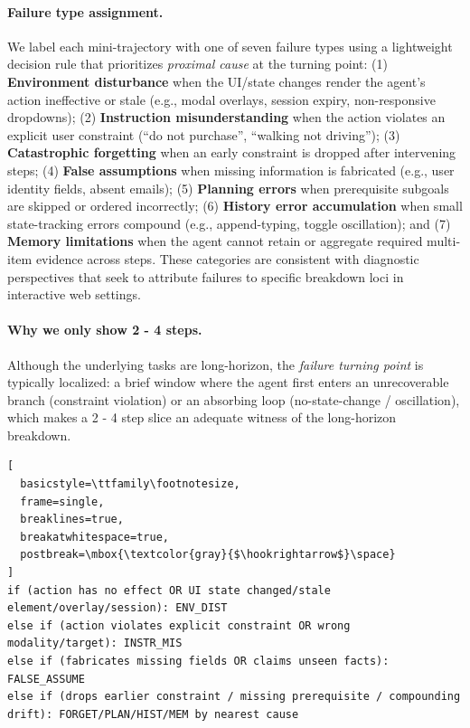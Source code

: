 \documentclass[11pt]{article}
\begin{document}
\paragraph{Failure type assignment.}
We label each mini-trajectory with one of seven failure types using a lightweight decision rule that prioritizes \emph{proximal cause} at the turning point: (1) \textbf{Environment disturbance} when the UI/state changes render the agent's action ineffective or stale (e.g., modal overlays, session expiry, non-responsive dropdowns); (2) \textbf{Instruction misunderstanding} when the action violates an explicit user constraint (``do not purchase'', ``walking not driving''); (3) \textbf{Catastrophic forgetting} when an early constraint is dropped after intervening steps; (4) \textbf{False assumptions} when missing information is fabricated (e.g., user identity fields, absent emails); (5) \textbf{Planning errors} when prerequisite subgoals are skipped or ordered incorrectly; (6) \textbf{History error accumulation} when small state-tracking errors compound (e.g., append-typing, toggle oscillation); and (7) \textbf{Memory limitations} when the agent cannot retain or aggregate required multi-item evidence across steps. These categories are consistent with diagnostic perspectives that seek to attribute failures to specific breakdown loci in interactive web settings.

\paragraph{Why we only show 2 - 4 steps.}
Although the underlying tasks are long-horizon, the \emph{failure turning point} is typically localized: a brief window where the agent first enters an unrecoverable branch (constraint violation) or an absorbing loop (no-state-change / oscillation), which makes a 2 - 4 step slice an adequate witness of the long-horizon breakdown.
\begin{lstlisting}[
  basicstyle=\ttfamily\footnotesize,
  frame=single,
  breaklines=true,
  breakatwhitespace=true,
  postbreak=\mbox{\textcolor{gray}{$\hookrightarrow$}\space}
]
if (action has no effect OR UI state changed/stale element/overlay/session): ENV_DIST
else if (action violates explicit constraint OR wrong modality/target): INSTR_MIS
else if (fabricates missing fields OR claims unseen facts): FALSE_ASSUME
else if (drops earlier constraint / missing prerequisite / compounding drift): FORGET/PLAN/HIST/MEM by nearest cause
\end{lstlisting}
\end{document}
